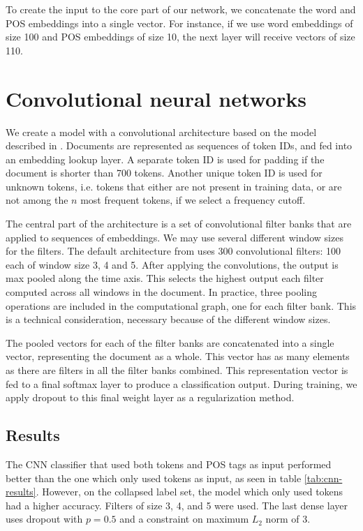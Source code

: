 To create the input to the core part of our network, we concatenate the word
and POS embeddings into a single vector. For instance, if we use word
embeddings of size 100 and POS embeddings of size 10, the next layer will
receive vectors of size 110.


\section{Convolutional neural networks}

We create a model with a convolutional architecture based on the model
described in \textcite{kim2014convolutional}. Documents are represented as
sequences of token IDs, and fed into an embedding lookup layer. A separate
token ID is used for padding if the document is shorter than 700 tokens.
Another unique token ID is used for unknown tokens, i.e. tokens that either
are not present in training data, or are not among the $n$ most frequent
tokens, if we select a frequency cutoff.

The central part of the architecture is a set of convolutional filter banks
that are applied to sequences of embeddings. We may use several different
window sizes for the filters. The default architecture from
\textcite{kim2014convolutional} uses 300 convolutional filters: 100 each of
window size 3, 4 and 5. After applying the convolutions, the output is max
pooled along the time axis. This selects the highest output each filter
computed across all windows in the document. In practice, three pooling
operations are included in the computational graph, one for each filter bank.
This is a technical consideration, necessary because of the different window
sizes.

The pooled vectors for each of the filter banks are concatenated into a
single vector, representing the document as a whole. This vector has as many
elements as there are filters in all the filter banks combined. This
representation vector is fed to a final softmax layer to produce a
classification output. During training, we apply dropout to this final weight
layer as a regularization method.


\subsection{Results}

The \ac{CNN} classifier that used both tokens and POS tags as input performed
better than the one which only used tokens as input, as seen in table
\ref{tab:cnn-results}. However, on the collapsed label set, the model which
only used tokens had a higher accuracy. Filters of size 3, 4, and 5 were
used. The last dense layer uses dropout with $p=0.5$ and a constraint on
maximum $L_2$ norm of 3.

